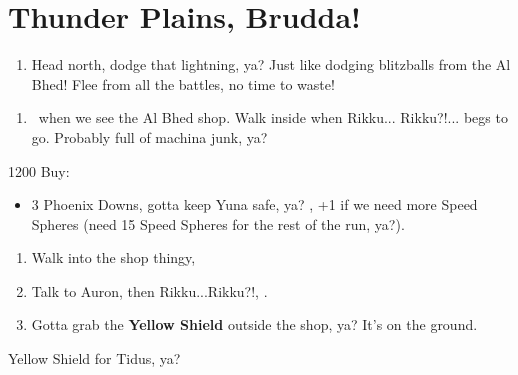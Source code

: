 \chapter{Thunder Plains, Brudda!}

\begin{enumerate}
    \item Head north, dodge that lightning, ya? Just like dodging blitzballs from the Al Bhed! Flee from all the battles, no time to waste!
\end{enumerate}
\begin{enumerate}[resume]
    \item \sd\ when we see the Al Bhed shop. Walk inside when Rikku... Rikku?!... begs to go. Probably full of machina junk, ya?
\end{enumerate}
\begin{shop}{1200}
    Buy:
    \begin{itemize}
        \item 3 Phoenix Downs, gotta keep Yuna safe, ya?
        , +1 if we need more Speed Spheres (need 15 Speed Spheres for the rest of the run, ya?).
    \end{itemize}
\end{shop}
\begin{enumerate}[resume]
    \item Walk into the shop thingy, \cs[2:00]
    \item Talk to Auron, then Rikku...Rikku?!, \sd.
    \item Gotta grab the \textbf{Yellow Shield} outside the shop, ya? It's on the ground.
\end{enumerate}
\begin{equip}
    \begin{itemize}
        \tidusf Yellow Shield for Tidus, ya?
    \end{itemize}
\end{equip}
